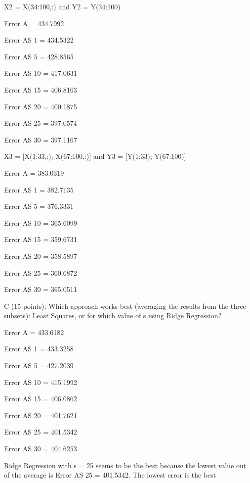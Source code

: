 \documentclass{report}
\begin{document}
\begin{flushleft}
X2 = X(34:100,:) and Y2 = Y(34:100)

Error A = 434.7992

Error AS 1 = 434.5322

Error AS 5 = 428.8565

Error AS 10 = 417.0631

Error AS 15 = 406.8163

Error AS 20 = 400.1875

Error AS 25 = 397.0574

Error AS 30 = 397.1167
\end{flushleft}

\begin{flushleft}
X3 = [X(1:33,:); X(67:100,:)] and Y3 = [Y(1:33); Y(67:100)]

Error A = 383.0319

Error AS 1 = 382.7135

Error AS 5 = 376.3331

Error AS 10 = 365.6099

Error AS 15 = 359.6731

Error AS 20 = 358.5897

Error AS 25 = 360.6872

Error AS 30 = 365.0511
\end{flushleft}

\begin{flushleft}
C (15 points): Which approach works best (averaging the results from the three subsets): Least Squares, or for which value of s using Ridge Regression?
\end{flushleft}

\begin{flushleft}
Error A = 433.6182

Error AS 1 = 433.3258

Error AS 5 = 427.2039

Error AS 10 = 415.1992

Error AS 15 = 406.0862

Error AS 20 = 401.7621

Error AS 25 = 401.5342

Error AS 30 = 404.6253
\end{flushleft}

\begin{flushleft}
Ridge Regression with s = 25  seems to be the best because the lowest value out of the average is Error AS 25 = 401.5342. The lowest error is the best
\end{flushleft}
\end{document}
